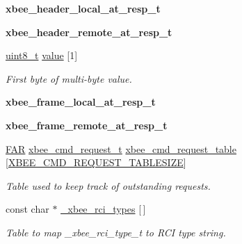 \begin{DoxyCompactItemize}
\mbox{\label{group__xbee__atcmd_gadee54f5443232dd369d7f30cea874c69}} 
{\bfseries xbee\+\_\+header\+\_\+local\+\_\+at\+\_\+resp\+\_\+t}
\item 
\mbox{\label{group__xbee__atcmd_gaa69f16913b7efb4fafc34dbdccf198cd}} 
{\bfseries xbee\+\_\+header\+\_\+remote\+\_\+at\+\_\+resp\+\_\+t}
\item 
\hyperlink{group__hal__dos_gae1affc9ca37cfb624959c866a73f83c2}{uint8\+\_\+t} \hyperlink{group__xbee__atcmd_ga5bf2410fa8ec37f47f8afeba8dcc7f1b}{value} \mbox{[}1\mbox{]}
\begin{DoxyCompactList}\small\item\em First byte of multi-\/byte value. \end{DoxyCompactList}\item 
\mbox{\label{group__xbee__atcmd_gab63b15c8139a653c95998e4c1bcd2b99}} 
{\bfseries xbee\+\_\+frame\+\_\+local\+\_\+at\+\_\+resp\+\_\+t}
\item 
\mbox{\label{group__xbee__atcmd_ga4c2b2ae22bdb77d9f8427b9bfff5a35d}} 
{\bfseries xbee\+\_\+frame\+\_\+remote\+\_\+at\+\_\+resp\+\_\+t}
\item 
\mbox{\label{group__xbee__atcmd_ga551531248de3d539dfb15bd89cf4734b}} 
\hyperlink{group__hal_gaef060b3456fdcc093a7210a762d5f2ed}{F\+AR} \hyperlink{structxbee__cmd__request__t}{xbee\+\_\+cmd\+\_\+request\+\_\+t} \hyperlink{group__xbee__atcmd_ga551531248de3d539dfb15bd89cf4734b}{xbee\+\_\+cmd\+\_\+request\+\_\+table} \mbox{[}\hyperlink{group__xbee__atcmd_gaf992e9b985e2b1eb185ef3d2d38a01c0}{X\+B\+E\+E\+\_\+\+C\+M\+D\+\_\+\+R\+E\+Q\+U\+E\+S\+T\+\_\+\+T\+A\+B\+L\+E\+S\+I\+ZE}\mbox{]}
\begin{DoxyCompactList}\small\item\em Table used to keep track of outstanding requests. \end{DoxyCompactList}\item 
\mbox{\label{group__xbee__atcmd_ga62238d483c628f8c996664ff0f47ccef}} 
const char $\ast$ \hyperlink{group__xbee__atcmd_ga62238d483c628f8c996664ff0f47ccef}{\+\_\+xbee\+\_\+rci\+\_\+types} \mbox{[}$\,$\mbox{]}
\begin{DoxyCompactList}\small\item\em Table to map \+\_\+xbee\+\_\+rci\+\_\+type\+\_\+t to R\+CI type string. \end{DoxyCompactList}\item 

\end{DoxyCompactItemize}
